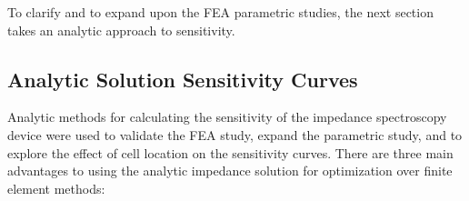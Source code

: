 
\par To clarify and to expand upon the FEA parametric studies, the next section takes an analytic approach to sensitivity.









\FloatBarrier
\clearpage

\subsection{Analytic Solution Sensitivity Curves}

\par Analytic methods for calculating the sensitivity of the impedance spectroscopy device were used to validate the FEA study, expand the parametric study, and to explore the effect of cell location on the sensitivity curves. There are three main advantages to using the analytic impedance solution for optimization over finite element methods:

